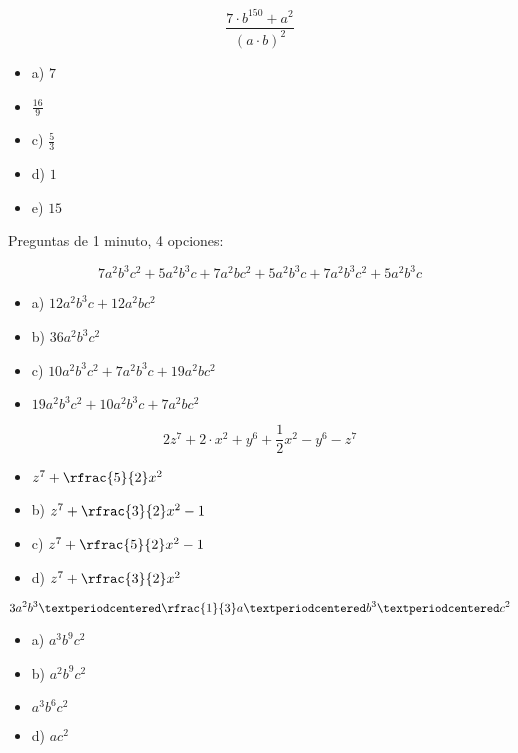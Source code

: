 \[
	\frac{7·b^{150}+a^2}{(a·b)^2}
\]

\begin{itemize}
	\item a) $7$
	\item {} $\frac{16}{9}$
	\item c) $\frac{5}{3}$
	\item d) $1$
	\item e) $15$
\end{itemize}


\newbloq Preguntas de 1 minuto, 4 opciones:

\[
	7a^2b^3c^2 + 5a^2b^3c  + 7a^2bc^2 + 5a^2b^3c + 7a^2b^3c^2 + 5a^2b^3c 
\]

\begin{itemize}
	\item a) $12a^2b^3c + 12a^2bc^2$
	\item b) $36a^2b^3c^2$
	\item c) $10a^2b^3c^2 + 7a^2b^3c + 19a^2bc^2$
	\item {} $19a^2b^3c^2 + 10a^2b^3c + 7a^2bc^2$
\end{itemize}

\[
	2z^7 + 2·x^2 + y^6 + \frac{1}{2}x^2 - y^6 -z^7
\]

\begin{itemize}
	\item {} $z^7 + \rfrac{5}{2}x^2$
	\item b) $z^7 + \rfrac{3}{2}x^2 - 1$
	\item c) $z^7 + \rfrac{5}{2}x^2 - 1$
	\item d) $z^7 + \rfrac{3}{2}x^2$
\end{itemize}


\[
	3a^2b^3 · \rfrac{1}{3}a·b^3·c^2
\]

\begin{itemize}
	\item a) $a^3b^9c^2$
	\item b) $a^2b^9c^2$
	\item {} $a^3b^6c^2$
	\item d) $ac^2$
\end{itemize}



